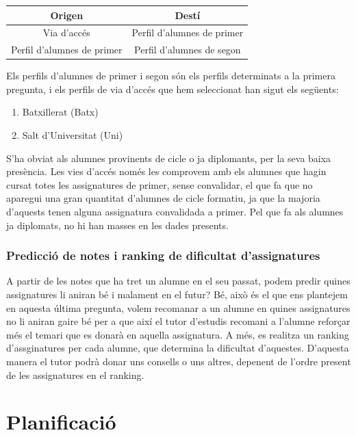 \documentclass[12pt,a4paper,catalan]{article}
\begin{document}
\begin{table}[h]
\centering
\begin{tabular}{@{}cc@{}}
\toprule
{\bf Origen}               & {\bf Destí}                \\ \midrule
Via d'accés                & Perfil d'alumnes de primer \\
Perfil d'alumnes de primer & Perfil d'alumnes de segon  \\ \bottomrule
\end{tabular}
\end{table}

Els perfils d'alumnes de primer i segon són els perfils determinats a la primera pregunta, i els perfils de via d'accés que hem seleccionat han sigut els següents:
\begin{enumerate}
	\item Batxillerat (Batx)
	\item Salt d'Universitat (Uni)
\end{enumerate}

S'ha obviat als alumnes provinents de cicle o ja diplomants, per la seva baixa presència. Les vies d'accés només les comprovem amb els alumnes que hagin cursat totes les assignatures de primer, sense convalidar, el que fa que no aparegui una gran quantitat d'alumnes de cicle formatiu, ja que la majoria d'aquests tenen alguna assignatura convalidada a primer. Pel que fa als alumnes ja diplomats, no hi han masses en les dades presents.

\subsubsection{Predicció de notes i ranking de dificultat d'assignatures}
A partir de les notes que ha tret un alumne en el seu passat, podem predir quines assignatures li aniran bé i malament en el futur? Bé, això és el que ens plantejem en aquesta última pregunta, volem recomanar a un alumne en quines assignatures no li aniran gaire bé per a que així el tutor d'estudis recomani a l'alumne reforçar més el temari que es donarà en aquella assignatura. A més, es realitza un ranking d'assginatures per cada alumne, que determina la dificultat d'aquestes. D'aquesta manera el tutor podrà donar uns consells o uns altres, depenent de l'ordre present de les assignatures en el ranking.
\newpage

\section{Planificació}
\end{document}
